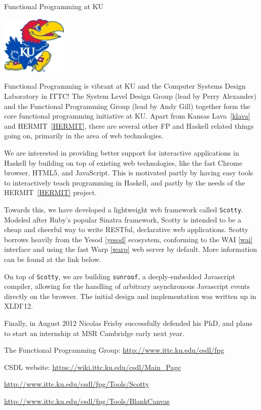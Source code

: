 \begin{hcarentry}{Functional Programming at KU}
\label{ukansas}
\makeheader

\begin{center}
\includegraphics[width=0.235\textwidth]{html/jh2.jpg}
\end{center}

Functional Programming is vibrant at KU and
the Computer Systems Design Laboratory in ITTC!
The System Level Design Group (lead by Perry Alexander)
and the Functional Programming Group (lead by Andy Gill)
together form the core functional programming initiative at KU.
Apart from Kansas Lava~\cref{klava} and HERMIT~\cref{HERMIT},
there are several other
FP and Haskell related things going on,
primarily in the area of web technologies.

We are interested in providing better support for
interactive applications in Haskell by building on top of existing web technologies,
like the fast Chrome browser, HTML5, and JavaScript. This is motivated
partly by having easy tools to interactively teach programming in Haskell,
and partly by the needs of the HERMIT~\cref{HERMIT} project.

Towards this, we have developed a lightweight web framework called {\tt Scotty}.
Modeled after Ruby's popular Sinatra framework, Scotty is intended to
be a cheap and cheerful way to write RESTful, declarative web applications.
Scotty borrows heavily from the Yesod \cref{yesod} ecosystem, conforming
to the WAI \cref{wai} interface and using the fast Warp \cref{warp} web server
by default. More information can be found at the link below.

On top of {\tt Scotty}, we are building {\tt sunroof},
a deeply-embedded Javascript compiler, allowing for
the handling of arbitrary asynchronous Javascript events
directly on the browser. The initial design and
implementation was written up in  XLDI'12.

Finally, in August 2012 Nicolas Frisby successfully defended his
PhD, and plans to start an internship at MSR Cambridge early
next year. 

\FurtherReading
\begin{compactitem}
\item   The Functional Programming Group:
    \url{http://www.ittc.ku.edu/csdl/fpg}
\item
  CSDL website: \url{https://wiki.ittc.ku.edu/csdl/Main_Page}
\item \url{http://www.ittc.ku.edu/csdl/fpg/Tools/Scotty}
\item \url{http://www.ittc.ku.edu/csdl/fpg/Tools/BlankCanvas}
\end{compactitem}
\end{hcarentry}
